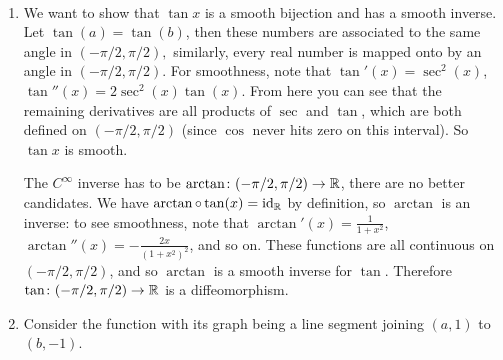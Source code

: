 \begin{solution}\,
\begin{enumerate}[label=(\alph*)]
    \item We want to show that $\tan x$ is a smooth bijection and has a smooth inverse. Let $\tan(a)=\tan(b)$, then these numbers are associated to the same angle in $(-\pi /2, \pi /2),$ similarly, every real number is mapped onto by an angle in $(- \pi/2, \pi /2)$. For smoothness, note that $\tan'(x)=\sec^2(x)$, $\tan ''(x)=2\sec ^2 (x)\tan(x)$. From here you can see that the remaining derivatives are all products of $\sec$ and $\tan$, which are both defined on $(-\pi /2, \pi /2)$ (since $\cos$ never hits zero on this interval). So $\tan x$ is smooth.

        The $C^{\infty}$ inverse has to be $\arctan \colon (-\pi /2, \pi /2)\to \mathbb{R}$, there are no better candidates. We have $\arctan \circ \tan (x)= \operatorname{id}_{\mathbb{R}}$ by definition, so $\arctan$ is an inverse: to see smoothness, note that $\arctan'(x)=\frac{1}{1+x^2}$, $\arctan''(x)=-\frac{2x}{(1+x^2)^2}$, and so on. These functions are all continuous on $(-\pi /2, \pi /2)$, and so $\arctan $ is a smooth inverse for $\tan$. Therefore $\tan \colon (- \pi /2, \pi /2) \to \mathbb{R}$ is a diffeomorphism.
    \item Consider the function with its graph being a line segment joining $(a,1)$ to $(b,-1)$.
\end{enumerate}
\end{solution}



